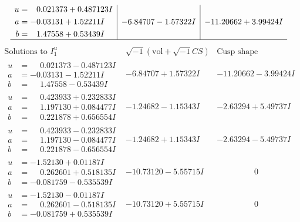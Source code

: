\documentclass[1p]{elsarticle_modified}
\theoremstyle{definition}
\newcommand{\I}{\sqrt{-1}}
\begin{document}
$$\begin{array}{c|c|c}
\begin{aligned}
u &= \phantom{-}0.021373 + 0.487123 I \\
a &= -0.03131 + 1.52211 I \\
b &= \phantom{-}1.47558 + 0.53439 I\end{aligned}
 & -6.84707 - 1.57322 I & -11.20662 + 3.99424 I\\
 \hline 
 \end{array}$$\newpage$$\begin{array}{c|c|c}  
\text{Solutions to }I^u_{1}& \I (\text{vol} + \sqrt{-1}CS) & \text{Cusp shape}\\
 \hline 
\begin{aligned}
u &= \phantom{-}0.021373 - 0.487123 I \\
a &= -0.03131 - 1.52211 I \\
b &= \phantom{-}1.47558 - 0.53439 I\end{aligned}
 & -6.84707 + 1.57322 I & -11.20662 - 3.99424 I \\ \hline\begin{aligned}
u &= \phantom{-}0.423933 + 0.232833 I \\
a &= \phantom{-}1.197130 + 0.084477 I \\
b &= \phantom{-}0.221878 + 0.656554 I\end{aligned}
 & -1.24682 - 1.15343 I & -2.63294 + 5.49737 I \\ \hline\begin{aligned}
u &= \phantom{-}0.423933 - 0.232833 I \\
a &= \phantom{-}1.197130 - 0.084477 I \\
b &= \phantom{-}0.221878 - 0.656554 I\end{aligned}
 & -1.24682 + 1.15343 I & -2.63294 - 5.49737 I \\ \hline\begin{aligned}
u &= -1.52130 + 0.01187 I \\
a &= \phantom{-}0.262601 + 0.518135 I \\
b &= -0.081759 - 0.535539 I\end{aligned}
 & -10.73120 - 5.55715 I & \phantom{-0.000000 } 0 \\ \hline\begin{aligned}
u &= -1.52130 - 0.01187 I \\
a &= \phantom{-}0.262601 - 0.518135 I \\
b &= -0.081759 + 0.535539 I\end{aligned}
 & -10.73120 + 5.55715 I & \phantom{-0.000000 } 0 \\ \hline\begin{aligned}

\end{aligned}
\end{array}$$
\end{document}

